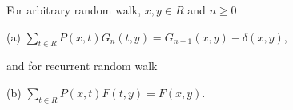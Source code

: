 For arbitrary random walk, $x,y \in R$ and $n \geq 0$

(a) $\sum_{t \in R} P(x,t)G_n(t,y) = G_{n+1}(x,y) - \delta(x,y)$,

and for recurrent random walk

(b) $\sum_{t \in R} P(x,t)F(t,y) = F(x,y)$.